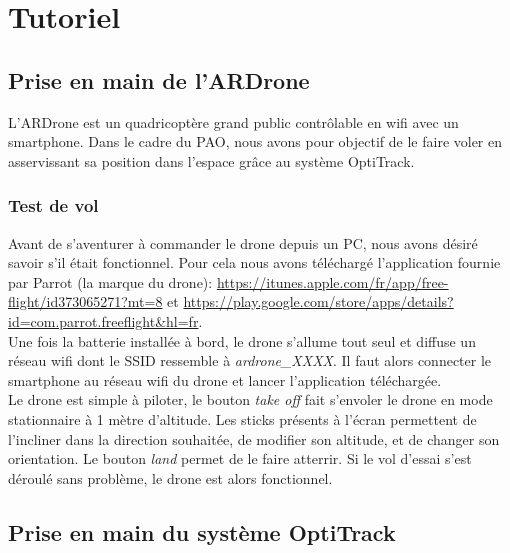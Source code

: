 \chapter{Tutoriel}
\label{chap:tutoriel}

    \section{Prise en main de l'ARDrone}
    \label{sec:prise_en_main_de_l_ardrone}
        L'ARDrone est un quadricoptère grand public contrôlable en wifi avec un smartphone. Dans le cadre du PAO, nous avons pour objectif de le faire voler en asservissant sa position dans l'espace grâce au système OptiTrack.

        \subsection{Test de vol}
            Avant de s'aventurer à commander le drone depuis un PC, nous avons désiré savoir s'il était fonctionnel. Pour cela nous avons téléchargé l'application fournie par Parrot (la marque du drone): \url{https://itunes.apple.com/fr/app/free-flight/id373065271?mt=8} et \url{https://play.google.com/store/apps/details?id=com.parrot.freeflight&hl=fr}. \\

            Une fois la batterie installée à bord, le drone s'allume tout seul et diffuse un réseau wifi dont le SSID ressemble à \textit{ardrone\_XXXX}. Il faut alors connecter le smartphone au réseau wifi du drone et lancer l'application téléchargée. \\

            Le drone est simple à piloter, le bouton \textit{take off} fait s'envoler le drone en mode stationnaire à 1 mètre d'altitude. Les sticks présents à l'écran permettent de l'incliner dans la direction souhaitée, de modifier son altitude, et de changer son orientation. Le bouton \textit{land} permet de le faire atterrir. Si le vol d'essai s'est déroulé sans problème, le drone est alors fonctionnel.


    \section{Prise en main du système OptiTrack}
    \label{sec:prise_en_main_du_systeme_optitrack}
